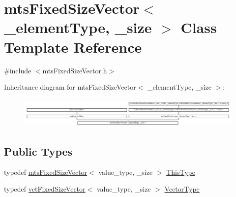 \hypertarget{classmts_fixed_size_vector}{}\section{mts\+Fixed\+Size\+Vector$<$ \+\_\+element\+Type, \+\_\+size $>$ Class Template Reference}
\label{classmts_fixed_size_vector}


{\ttfamily \#include $<$mts\+Fixed\+Size\+Vector.\+h$>$}

Inheritance diagram for mts\+Fixed\+Size\+Vector$<$ \+\_\+element\+Type, \+\_\+size $>$\+:\begin{figure}[H]
\begin{center}
\leavevmode
\includegraphics[height=1.555556cm]{da/dfc/classmts_fixed_size_vector}
\end{center}
\end{figure}
\subsection*{Public Types}
\begin{DoxyCompactItemize}
\item 
typedef \hyperlink{classmts_fixed_size_vector}{mts\+Fixed\+Size\+Vector}$<$ value\+\_\+type, \+\_\+size $>$ \hyperlink{classmts_fixed_size_vector_afdc3f321836a8df42be6bed595148de7}{This\+Type}
\item 
typedef \hyperlink{classvct_fixed_size_vector}{vct\+Fixed\+Size\+Vector}$<$ value\+\_\+type, \+\_\+size $>$ \hyperlink{classmts_fixed_size_vector_ac5c774708b6dab6c0fe332c5fcd2c5ad}{Vector\+Type}
\end{DoxyCompactItemize}
